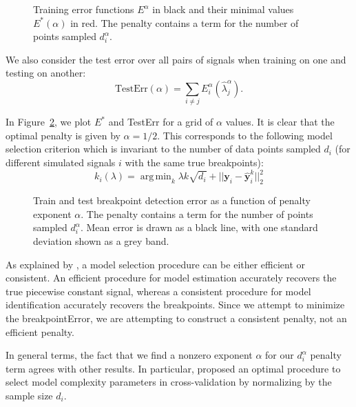 \documentclass{article}
\newcommand{\fig}[3][H]{
  \begin{figure}[#1]
    \hskip -1cm
    
    \caption{#3}
    \label{fig:#2}
  \end{figure}
}
\DeclareMathOperator*{\argmin}{arg\,min}
\begin{document}
\fig{variable-density-error-train}{Training error functions $E^\alpha$
  in black and their minimal values $E^*(\alpha)$ in red. The penalty
  contains a term for the number of points sampled $d_i^\alpha$.}

\newpage

We also consider the test error over all pairs of signals when
training on one and testing on another:
\begin{equation}
  \label{eq:lerr_test}
  \text{TestErr}(\alpha) = 
  \sum_{i\neq j} E^\alpha_i(\hat \lambda_j^\alpha).
\end{equation}

In Figure~\ref{fig:variable-density-error-alpha}, we plot $E^*$ and
TestErr for a grid of $\alpha$ values.  It is clear that the optimal
penalty is given by $\alpha=1/2$. This corresponds to the following
model selection criterion which is invariant to the number of data
points sampled $d_i$ (for different simulated signals $i$ with the
same true breakpoints):
\begin{equation}
  \label{eq:var_dens_opt_pen}
  k_i(\lambda) = 
  \argmin_k \lambda k \sqrt{d_i}+||\mathbf y_i-\mathbf{\hat y}_i^k||^2_2
\end{equation}

\fig{variable-density-error-alpha}{Train and test breakpoint detection
  error as a function of penalty exponent $\alpha$. The penalty
  contains a term for the number of points sampled $d_i^\alpha$. Mean
  error is drawn as a black line, with one standard deviation shown as
  a grey band.}

\newpage

As explained by \citet{sylvain-survey}, a model selection procedure
can be either efficient or consistent. An efficient procedure for
model estimation accurately recovers the true piecewise constant signal, whereas a
consistent procedure for model identification accurately recovers the
breakpoints. Since we attempt to minimize the breakpointError, we are
attempting to construct a consistent penalty, not an efficient
penalty.

In general terms, the fact that we find a nonzero exponent $\alpha$
for our $d_i^\alpha$ penalty term agrees with other results. In
particular, \citet{vfold} proposed an optimal procedure to select model
complexity parameters in cross-validation by normalizing by the sample
size $d_i$. 
\end{document}
